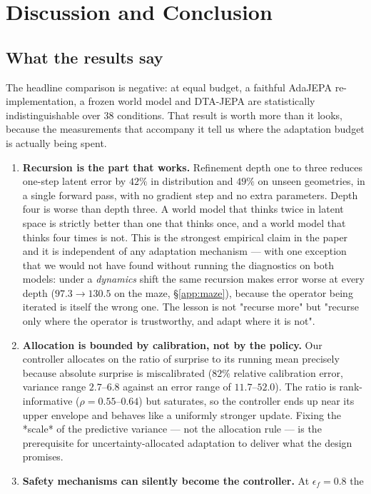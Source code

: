 \section{Discussion and Conclusion}

\subsection{What the results say}

The headline comparison is negative: at equal budget, a faithful AdaJEPA re-implementation, a
frozen world model and DTA-JEPA are statistically indistinguishable over 38 conditions. That
result is worth more than it looks, because the measurements that accompany it tell us where
the adaptation budget is actually being spent.

\begin{enumerate}[leftmargin=1.2em,itemsep=2pt]
\item \textbf{Recursion is the part that works.} Refinement depth one to three reduces one-step
latent error by $42\%$ in distribution and $49\%$ on unseen geometries, in a single forward
pass, with no gradient step and no extra parameters. Depth four is worse than depth three. A
world model that thinks twice in latent space is strictly better than one that thinks once, and
a world model that thinks four times is not. This is the strongest empirical claim in the paper
and it is independent of any adaptation mechanism --- with one exception that we would not have
found without running the diagnostics on both models: under a \emph{dynamics} shift the same
recursion makes error worse at every depth ($97.3 \to 130.5$ on the maze, \S\ref{app:maze}),
because the operator being iterated is itself the wrong one. The lesson is not "recurse more"
but "recurse only where the operator is trustworthy, and adapt where it is not".
\item \textbf{Allocation is bounded by calibration, not by the policy.} Our controller allocates
on the ratio of surprise to its running mean precisely because absolute surprise is
miscalibrated ($82\%$ relative calibration error, variance range $2.7$--$6.8$ against an error
range of $11.7$--$52.0$). The ratio is rank-informative ($\rho = 0.55$--$0.64$) but saturates,
so the controller ends up near its upper envelope and behaves like a uniformly stronger update.
Fixing the *scale* of the predictive variance --- not the allocation rule --- is the
prerequisite for uncertainty-allocated adaptation to deliver what the design promises.
\item \textbf{Safety mechanisms can silently become the controller.} At $\epsilon_f = 0.8$ the

\end{enumerate}
